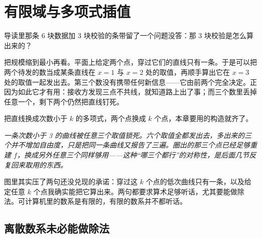 \section{有限域与多项式插值}
\label{sec:04-Discrete-Mathematics/05-Coding-and-Polynomial-Methods/01}

导读里那条 6 块数据加 3 块校验的条带留了一个问题没答：那 3 块校验是怎么算出来的？

把规模缩到最小再看。平面上给定两个点，穿过它们的直线只有一条。于是可以把两个待发的数当成某条直线在 \(x=1\) 与 \(x=2\) 处的取值，再顺手算出它在 \(x=3\) 处的取值一起发出去。第三个数没有携带任何新信息——它由前两个完全决定。正因为如此它才有用：接收方发现三点不共线，就知道路上出了事；而三个数里丢掉任意一个，剩下两个仍然把直线钉死。

把直线换成次数小于 \(k\) 的多项式，两个点换成 \(k\) 个点，本章要用的构造就齐了。

\begin{center}

\emph{一条次数小于 3 的曲线被任意三个取值锁死。六个取值全都发出去，多出来的三个并不增加自由度，只是把同一条曲线又报告了三遍。圈出的那三个点已经足够重建 \(f\)，换成另外任意三个同样够用——这种``哪三个都行''的对称性，是后面几节反复回来取用的东西。}
\end{center}

图里其实压了两句还没兑现的承诺：穿过这 \(k\) 个点的低次曲线只有一条，以及给定任意 \(k\) 个点我确实能把它算出来。两句都要求算术足够听话，尤其要能做除法。可计算机里的数系是有限的，有限的数系并不都听话。

\subsection{离散数系未必能做除法}

